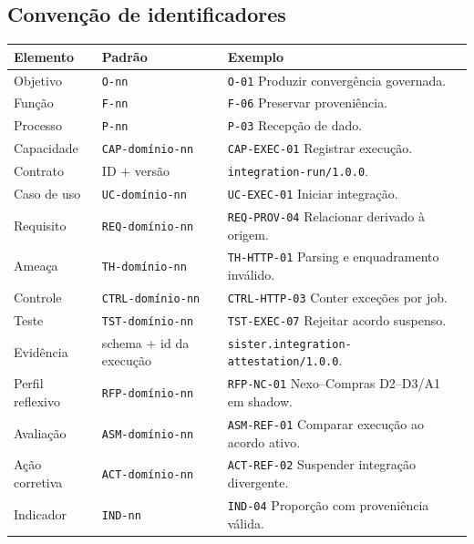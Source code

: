 \documentclass[11pt,a4paper,oneside]{article}
\begin{document}
\subsection{Convenção de identificadores}
\begin{tabularx}{\textwidth}{P{3.0cm}P{3.3cm}Y}
\toprule
\textbf{Elemento} & \textbf{Padrão} & \textbf{Exemplo} \\
\midrule
Objetivo & \texttt{O-nn} & \texttt{O-01} Produzir convergência governada. \\
Função & \texttt{F-nn} & \texttt{F-06} Preservar proveniência. \\
Processo & \texttt{P-nn} & \texttt{P-03} Recepção de dado. \\
Capacidade & \texttt{CAP-domínio-nn} & \texttt{CAP-EXEC-01} Registrar execução. \\
Contrato & ID + versão & \texttt{integration-run/1.0.0}. \\
Caso de uso & \texttt{UC-domínio-nn} & \texttt{UC-EXEC-01} Iniciar integração. \\
Requisito & \texttt{REQ-domínio-nn} & \texttt{REQ-PROV-04} Relacionar derivado à origem. \\
Ameaça & \texttt{TH-domínio-nn} & \texttt{TH-HTTP-01} Parsing e enquadramento inválido. \\
Controle & \texttt{CTRL-domínio-nn} & \texttt{CTRL-HTTP-03} Conter exceções por job. \\
Teste & \texttt{TST-domínio-nn} & \texttt{TST-EXEC-07} Rejeitar acordo suspenso. \\
Evidência & schema + id da execução & \texttt{sister.integration-attestation/1.0.0}. \\
Perfil reflexivo & \texttt{RFP-domínio-nn} & \texttt{RFP-NC-01} Nexo--Compras D2--D3/A1 em shadow. \\
Avaliação & \texttt{ASM-domínio-nn} & \texttt{ASM-REF-01} Comparar execução ao acordo ativo. \\
Ação corretiva & \texttt{ACT-domínio-nn} & \texttt{ACT-REF-02} Suspender integração divergente. \\
Indicador & \texttt{IND-nn} & \texttt{IND-04} Proporção com proveniência válida. \\
\bottomrule
\end{tabularx}
\end{document}
